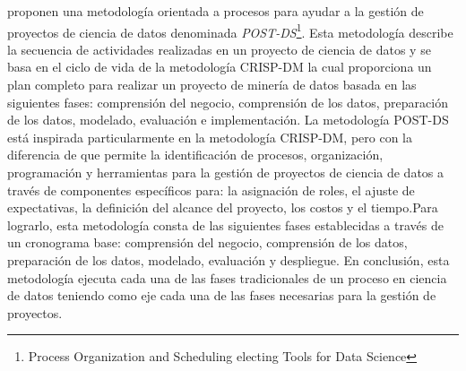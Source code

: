 \cite{Costa2020} proponen una metodología orientada a procesos para ayudar a la gestión de proyectos de ciencia de datos denominada \textit{POST-DS}\footnote{Process Organization and Scheduling electing Tools for Data Science}. Esta metodología describe la secuencia de actividades realizadas en un proyecto de ciencia de datos y se basa en el ciclo de vida de la metodología CRISP-DM la cual proporciona un plan completo para realizar un proyecto de minería de datos basada en las siguientes fases: comprensión del negocio, comprensión de los datos, preparación de los datos, modelado, evaluación e implementación. La metodología POST-DS está inspirada particularmente en la metodología CRISP-DM, pero con la diferencia de que permite la identificación de procesos, organización, programación y herramientas para la gestión de proyectos de ciencia de datos a través de componentes específicos para: la asignación de roles, el ajuste de expectativas, la definición del alcance del proyecto, los costos y el tiempo.Para lograrlo, esta metodología consta de las siguientes fases establecidas a través de un cronograma base: comprensión del negocio, comprensión de los datos, preparación de los datos, modelado, evaluación y despliegue. En conclusión, esta metodología ejecuta cada una de las fases tradicionales de un proceso en ciencia de datos teniendo como eje cada una de las fases necesarias para la gestión de proyectos.

